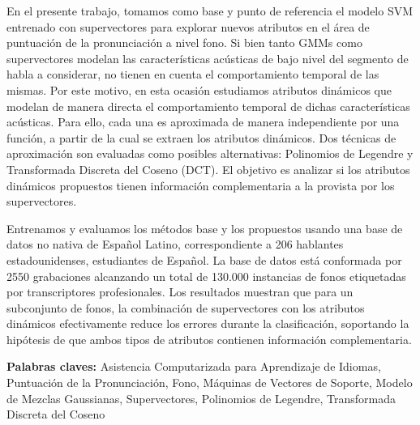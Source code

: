 En el presente trabajo, tomamos como
base y punto de referencia el modelo SVM entrenado con
supervectores para explorar nuevos atributos en el área de puntuación de la
pronunciación a nivel fono.
Si bien tanto GMMs como
supervectores modelan las características acústicas de
bajo nivel del segmento
de habla a considerar,
no tienen en cuenta el comportamiento temporal de las mismas.
Por este motivo, en esta ocasión
estudiamos atributos dinámicos
que modelan de manera directa el comportamiento temporal de dichas
características acústicas.
Para ello, cada una es aproximada
de manera independiente por una función,
a partir de la cual se extraen los atributos dinámicos.
Dos técnicas de aproximación son evaluadas como posibles alternativas:
Polinomios de Legendre y Transformada Discreta del Coseno (DCT).
El objetivo
es analizar si
los atributos dinámicos propuestos tienen información
complementaria a la provista por los supervectores.

Entrenamos y evaluamos los métodos base y los propuestos usando una base de datos no nativa
de Español Latino, correspondiente a 206 hablantes estadounidenses, estudiantes de Español.
La base de datos está conformada por 2550 grabaciones alcanzando
un total de 130.000 instancias de fonos etiquetadas
por transcriptores profesionales.
Los resultados muestran que para un subconjunto de fonos, la combinación de supervectores
con los atributos dinámicos efectivamente reduce los errores durante la clasificación,
soportando la
hipótesis de que ambos tipos de atributos contienen información complementaria.

\bigskip

\noindent\textbf{Palabras claves:} Asistencia Computarizada para Aprendizaje de Idiomas, Puntuación de la Pronunciación, Fono, Máquinas de Vectores de Soporte, Modelo de Mezclas Gaussianas, Supervectores, Polinomios de Legendre, Transformada Discreta del Coseno

